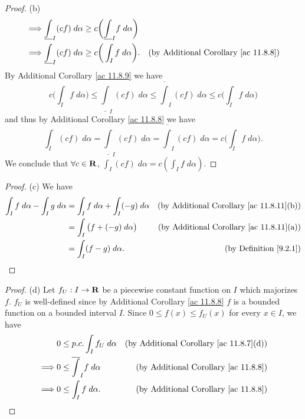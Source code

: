 \begin{proof}{(b)}
\begin{align*}
        \implies & \underline{\int}_I (cf) \; d \alpha \geq c\bigg(\underline{\int}_I f \; d \alpha\bigg)                                                                                                   \\
        \implies & \underline{\int}_I (cf) \; d \alpha \geq c\bigg(\int_I f \; d \alpha\bigg).                                                        & \text{(by Additional Corollary \ref{ac 11.8.8})}
    \end{align*}
    By Additional Corollary \ref{ac 11.8.9} we have
    \[
        c\bigg(\int_I f \; d \alpha\bigg) \leq \underline{\int}_I (cf) \; d \alpha \leq \overline{\int}_I (cf) \; d \alpha \leq c\bigg(\int_I f \; d \alpha\bigg)
    \]
    and thus by Additional Corollary \ref{ac 11.8.8} we have
    \[
        \int_I (cf) \; d \alpha = \underline{\int}_I (cf) \; d \alpha = \overline{\int}_I (cf) \; d \alpha = c\bigg(\int_I f \; d \alpha\bigg).
    \]
    We conclude that \(\forall c \in \mathbf{R}\), \(\int_I (cf) \; d \alpha = c (\int_I f \; d \alpha)\).
\end{proof}

\begin{proof}{(c)}
    We have
    \begin{align*}
        \int_I f \; d \alpha - \int_I g \; d \alpha & = \int_I f \; d \alpha + \int_I (-g) \; d \alpha & \text{(by Additional Corollary \ref{ac 11.8.11}(b))} \\
                                                    & = \int_I \big(f + (-g) \; d \alpha\big)          & \text{(by Additional Corollary \ref{ac 11.8.11}(a))} \\
                                                    & = \int_I (f - g) \; d \alpha.                    & \text{(by Definition \ref{9.2.1})}
    \end{align*}
\end{proof}

\begin{proof}{(d)}
    Let \(f_U : I \to \mathbf{R}\) be a piecewise constant function on \(I\) which majorizes \(f\).
    \(f_U\) is well-defined since by Additional Corollary \ref{ac 11.8.8} \(f\) is a bounded function on a bounded interval \(I\).
    Since \(0 \leq f(x) \leq f_U(x)\) for every \(x \in I\), we have
    \begin{align*}
                 & 0 \leq p.c. \int_I f_U \; d \alpha     & \text{(by Additional Corollary \ref{ac 11.8.7}(d))} \\
        \implies & 0 \leq \overline{\int}_I f \; d \alpha & \text{(by Additional Corollary \ref{ac 11.8.8})}    \\
        \implies & 0 \leq \int_I f \; d \alpha.           & \text{(by Additional Corollary \ref{ac 11.8.8})}
    \end{align*}
\end{proof}

